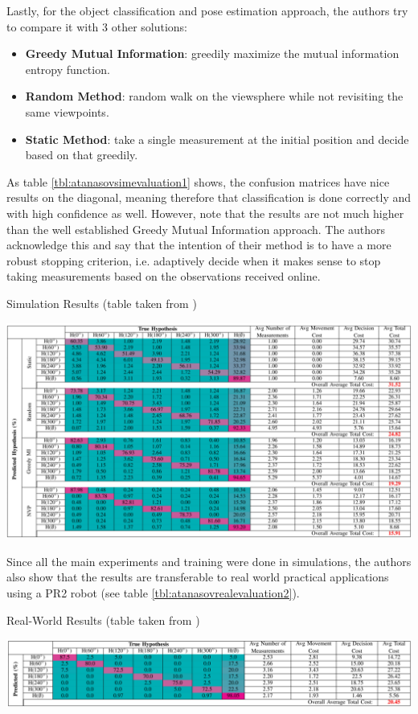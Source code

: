\documentclass[a4paper,11pt,english]{article}
\begin{document}
Lastly, for the object classification and pose estimation approach, the authors try to compare it with 3 other solutions:
\begin{itemize}
\item \textbf{Greedy Mutual Information}: greedily maximize the mutual information entropy function.
\item \textbf{Random Method}: random walk on the viewsphere while not revisiting the same viewpoints.
\item \textbf{Static Method}: take a single measurement at the initial position and decide based on that greedily. 
\end{itemize}

As table \ref{tbl:atanasovsimevaluation1} shows, the confusion matrices have nice results on the diagonal, meaning therefore that classification is done correctly and with high confidence as well. However, note that the results are not much higher than the well established Greedy Mutual Information approach. The authors acknowledge this and say that the intention of their method is to have a more robust stopping criterion, i.e. adaptively decide when it makes sense to stop taking measurements based on the observations received online. 

\begin{table}[H]
  \caption{Simulation Results (table taken from \cite{atanasov2014nonmyopic})}
  \label{tbl:atanasovsimevaluation1}
  \includegraphics[width=\linewidth]{atanasovevaluation1.png}
\end{table}

Since all the main experiments and training were done in simulations, the authors also show that the results are transferable to real world practical applications using a PR2 robot (see table \ref{tbl:atanasovrealevaluation2}). 

\begin{table}[H]
  \caption{Real-World Results (table taken from \cite{atanasov2014nonmyopic})}
  \label{tbl:atanasovrealevaluation2}
  \includegraphics[width=\linewidth]{atanasovevaluation2.png}
\end{table}
\end{document}
